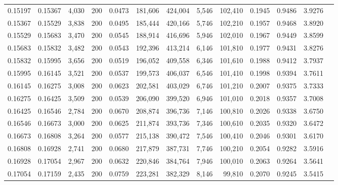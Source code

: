 \begin{tabular}{rrrrrrrrrrrrr}
0.15197 & 0.15367 &  4,030 & 200 &                                     0.0473 & 181,606 & 424,004 &   5,546 & 102,410 & 0.1945 & 0.9486 & 3.9276 \\
0.15367 & 0.15529 &  3,838 & 200 &                                     0.0495 & 185,444 & 420,166 &   5,746 & 102,210 & 0.1957 & 0.9468 & 3.8920 \\
0.15529 & 0.15683 &  3,470 & 200 &                                     0.0545 & 188,914 & 416,696 &   5,946 & 102,010 & 0.1967 & 0.9449 & 3.8599 \\
0.15683 & 0.15832 &  3,482 & 200 &                                     0.0543 & 192,396 & 413,214 &   6,146 & 101,810 & 0.1977 & 0.9431 & 3.8276 \\
0.15832 & 0.15995 &  3,656 & 200 &                                     0.0519 & 196,052 & 409,558 &   6,346 & 101,610 & 0.1988 & 0.9412 & 3.7937 \\
0.15995 & 0.16145 &  3,521 & 200 &                                     0.0537 & 199,573 & 406,037 &   6,546 & 101,410 & 0.1998 & 0.9394 & 3.7611 \\
0.16145 & 0.16275 &  3,008 & 200 &                                     0.0623 & 202,581 & 403,029 &   6,746 & 101,210 & 0.2007 & 0.9375 & 3.7333 \\
0.16275 & 0.16425 &  3,509 & 200 &                                     0.0539 & 206,090 & 399,520 &   6,946 & 101,010 & 0.2018 & 0.9357 & 3.7008 \\
0.16425 & 0.16546 &  2,784 & 200 &                                     0.0670 & 208,874 & 396,736 &   7,146 & 100,810 & 0.2026 & 0.9338 & 3.6750 \\
0.16546 & 0.16673 &  3,000 & 200 &                                     0.0625 & 211,874 & 393,736 &   7,346 & 100,610 & 0.2035 & 0.9320 & 3.6472 \\
0.16673 & 0.16808 &  3,264 & 200 &                                     0.0577 & 215,138 & 390,472 &   7,546 & 100,410 & 0.2046 & 0.9301 & 3.6170 \\
0.16808 & 0.16928 &  2,741 & 200 &                                     0.0680 & 217,879 & 387,731 &   7,746 & 100,210 & 0.2054 & 0.9282 & 3.5916 \\
0.16928 & 0.17054 &  2,967 & 200 &                                     0.0632 & 220,846 & 384,764 &   7,946 & 100,010 & 0.2063 & 0.9264 & 3.5641 \\
0.17054 & 0.17159 &  2,435 & 200 &                                     0.0759 & 223,281 & 382,329 &   8,146 &  99,810 & 0.2070 & 0.9245 & 3.5415 \\

\end{tabular}
